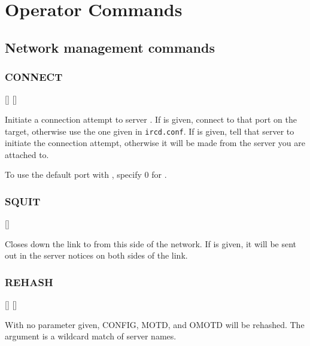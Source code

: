 \chapter{Operator Commands}
\label{commands}

\section{Network management commands}

\subsection{CONNECT}

  [] []

	Initiate a connection attempt to server . If
	 is given, connect to that port on the target,
	otherwise use the one given in \nolinkurl{ircd.conf}. If
	 is given, tell that server to initiate the
	connection attempt, otherwise it will be made from the server you
	are attached to.

	To use the default port with , specify 0 for
	.

\subsection{SQUIT}

  []

	Closes down the link to  from this side of the
	network. If  is given, it will be sent out in
	the server notices on both sides of the link.


\subsection{REHASH}

 [] []

	With no parameter given, CONFIG, MOTD, and OMOTD will be rehashed. The
	 argument is a wildcard match of server names.

